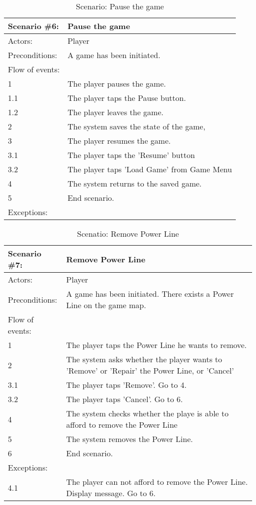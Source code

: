 \begin{table}
	\begin{tabular}{| l | p{10cm} |}
		\hline
		\rowcolor{lightgray}
		{\bf Scenario \#6:} & {\bf Pause the game} \\ \hline
		Actors: & Player \\ \hline
		Preconditions: & A game has been initiated. \\ \hline
		Flow of events: & \\ \hline
		1 & The player pauses the game. \\ \hline
		1.1 & The player taps the Pause button. \\ \hline
		1.2 & The player leaves the game. \\ \hline
		2 & The system saves the state of the game, \\ \hline
		3 & The player resumes the game. \\ \hline
		3.1 & The player taps the 'Resume' button \\ \hline
		3.2 & The player taps 'Load Game' from Game Menu \\ \hline
		4 & The system returns to the saved game. \\ \hline
		5 & End scenario. \\ \hline
		Exceptions: & \\ \hline
	\end{tabular}
	\caption{Scenario: Pause the game}
\end{table}

\begin{table}
	\begin{tabular}{| l | p{10cm} |}
		\hline
		\rowcolor{lightgray}
		{\bf Scenario \#7:} & {\bf Remove Power Line} \\ \hline
		Actors: & Player \\ \hline
		Preconditions: & A game has been initiated. There exists a Power Line on the game map. \\ \hline
		Flow of events: & \\ \hline
		1 & The player taps the Power Line he wants to remove. \\ \hline
		2 & The system asks whether the player wants to 'Remove' or 'Repair' the Power Line, or 'Cancel' \\ \hline
		3.1 & The player taps 'Remove'. Go to 4. \\ \hline
		3.2 & The player taps 'Cancel'. Go to 6. \\ \hline
		4 & The system checks whether the playe is able to afford to remove the Power Line \\ \hline
		5 & The system removes the Power Line. \\ \hline
		6 & End scenario. \\ \hline
		Exceptions: & \\ \hline
		4.1 & The player can not afford to remove the Power Line. Display message. Go to 6. \\ \hline
	\end{tabular}
	\caption{Scenatio: Remove Power Line}
\end{table}

